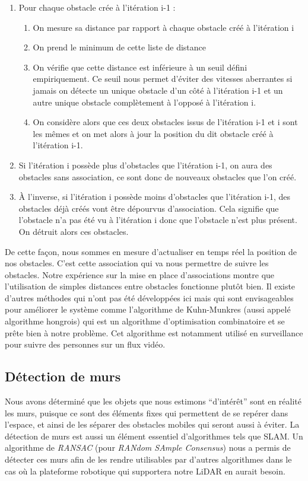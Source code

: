 \begin{enumerate}
    \item Pour chaque obstacle crée à l'itération i-1 :
        \tab \begin{enumerate}
            \item On mesure sa distance par rapport à chaque obstacle créé à l'itération i
            \item On prend le minimum de cette liste de distance
            \item On vérifie que cette distance est inférieure à un seuil défini empiriquement. Ce seuil nous permet d'éviter des vitesses aberrantes si jamais on détecte un unique obstacle d'un côté à l'itération i-1 et un autre unique obstacle complètement à l'opposé à l'itération i.
            \item On considère alors que ces deux obstacles issus de l'itération i-1 et i sont les mêmes et on met alors à jour la position du dit obstacle créé à l'itération i-1.
        \end{enumerate}
    \item Si l'itération i possède plus d'obstacles que l'itération i-1, on aura des obstacles sans association, ce sont donc de nouveaux obstacles que l'on créé. 
    \item À l'inverse, si l'itération i possède moins d'obstacles que l'itération i-1, des obstacles déjà créés vont être dépourvus d'association. Cela signifie que l'obstacle n'a pas été vu à l'itération i donc que l'obstacle n'est plus présent. On détruit alors ces obstacles.
\end{enumerate}
\tab De cette façon, nous sommes en mesure d'actualiser en temps réel la position de nos obstacles.\cite{multi-target-lidar} C'est cette association qui va nous permettre de suivre les obstacles. Notre expérience sur la mise en place d'associations montre que l'utilisation de simples distances entre obstacles fonctionne plutôt bien. Il existe d'autres méthodes qui n'ont pas été développées ici mais qui sont envisageables pour améliorer le système comme l'algorithme de Kuhn-Munkres (aussi appelé algorithme hongrois) qui est un algorithme d'optimisation combinatoire et se prête bien à notre problème. Cet algorithme est notamment utilisé en surveillance pour suivre des personnes sur un flux vidéo.

\subsection{Détection de murs}
\tab Nous avons déterminé que les objets que nous estimons “d’intérêt” sont en réalité les murs, puisque ce sont des éléments fixes qui permettent de se repérer dans l’espace, et ainsi de les séparer des obstacles mobiles qui seront aussi à éviter. La détection de murs est aussi un élément essentiel d'algorithmes tels que SLAM. Un algorithme de \textit{RANSAC} (pour \textit{RANdom SAmple Consensus}) nous a permis de détecter ces murs afin de les rendre utilisables par d’autres algorithmes dans le cas où la plateforme robotique qui supportera notre LiDAR en aurait besoin.

